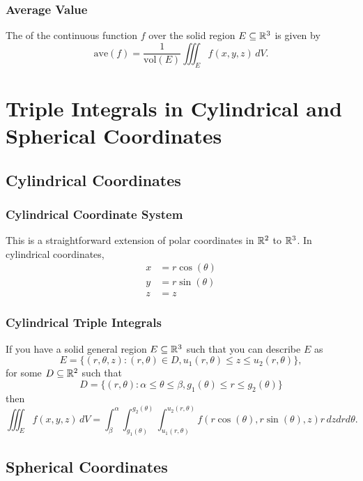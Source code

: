 \subsubsection{Average Value}

The  of the continuous function \(f\) over the solid region \(E \subseteq \mathbb{R}^3\) is given by
\[
  \text{ave}(f) = \frac{1}{\text{vol}(E)} \iiint_E f(x, y, z) \, dV.
\]

\newpage

\section{Triple Integrals in Cylindrical and Spherical Coordinates}

\subsection{Cylindrical Coordinates}

\subsubsection{Cylindrical Coordinate System}

This is a straightforward extension of polar coordinates in \(\mathbb{R}^2\) to \(\mathbb{R}^3\). In cylindrical coordinates,
\begin{align*}
  x & = r \cos(\theta) \\
  y & = r \sin(\theta) \\
  z & = z
\end{align*}

\subsubsection{Cylindrical Triple Integrals}

If you have a solid general region \(E \subseteq \mathbb{R}^3\) such that you can describe \(E\) as
\[
  E = \{(r, \theta, z) : (r, \theta) \in D, u_1(r, \theta) \leq z \leq u_2(r, \theta)\},
\]
for some \(D \subseteq \mathbb{R}^2\) such that
\[
  D = \{(r, \theta) : \alpha \leq \theta \leq \beta, g_1(\theta) \leq r \leq g_2(\theta)\}
\]
then
\[
  \iiint_E f(x, y, z) \, dV = \int_{\beta}^{\alpha} \int_{g_1(\theta)}^{g_2(\theta)} \int_{u_1(r, \theta)}^{u_2(r, \theta)} f(r \cos(\theta), r \sin(\theta), z) r \, dz dr d\theta.
\]

\subsection{Spherical Coordinates}

